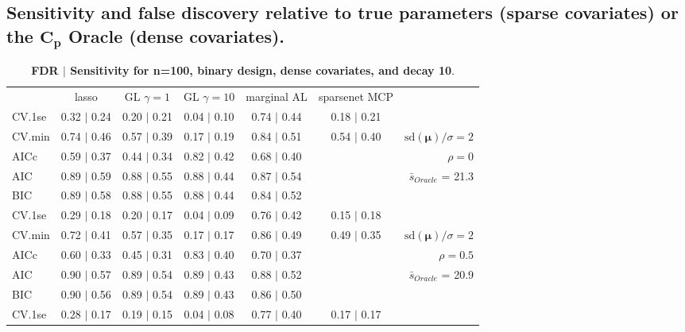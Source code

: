 \clearpage

\subsection{Sensitivity and false discovery relative to true parameters
 (sparse covariates) or the $\boldsymbol{C_p}$ Oracle (dense covariates). }


\begin{table}\vspace{-.5cm}
\caption[l]{ {\it }
{ \bf FDR $\boldsymbol{\mid}$ Sensitivity for n=100, binary design, dense covariates, and  decay  10}.}
\vspace{-.5cm}
\footnotesize{}
\begin{center}
\begin{tabular}{l*{5}{c}|r}
 & lasso & GL $\gamma=1$ & GL $\gamma=10$ & marginal AL & sparsenet MCP  & \\
 \cline{1-7}
CV.1se & 0.32 $\mid$ 0.24 & 0.20 $\mid$ 0.21 & 0.04 $\mid$ 0.10 & 0.74 $\mid$ 0.44 & 0.18 $\mid$ 0.21 & \\
CV.min & 0.74 $\mid$ 0.46 & 0.57 $\mid$ 0.39 & 0.17 $\mid$ 0.19 & 0.84 $\mid$ 0.51 & 0.54 $\mid$ 0.40 &  $\mathrm{sd}(\mathbf{\mu})/\sigma=2$ \\
AICc & 0.59 $\mid$ 0.37 & 0.44 $\mid$ 0.34 & 0.82 $\mid$ 0.42 & 0.68 $\mid$ 0.40 & & $\rho=0$ \\
AIC & 0.89 $\mid$ 0.59 & 0.88 $\mid$ 0.55 & 0.88 $\mid$ 0.44 & 0.87 $\mid$ 0.54 & &  \multirow{2}{*}{$\bar{s}_{Oracle}$ = 21.3} \\
BIC & 0.89 $\mid$ 0.58 & 0.88 $\mid$ 0.55 & 0.88 $\mid$ 0.44 & 0.84 $\mid$ 0.52 & &  \\
 \hline 
CV.1se & 0.29 $\mid$ 0.18 & 0.20 $\mid$ 0.17 & 0.04 $\mid$ 0.09 & 0.76 $\mid$ 0.42 & 0.15 $\mid$ 0.18 & \\
CV.min & 0.72 $\mid$ 0.41 & 0.57 $\mid$ 0.35 & 0.17 $\mid$ 0.17 & 0.86 $\mid$ 0.49 & 0.49 $\mid$ 0.35 &  $\mathrm{sd}(\mathbf{\mu})/\sigma=2$ \\
AICc & 0.60 $\mid$ 0.33 & 0.45 $\mid$ 0.31 & 0.83 $\mid$ 0.40 & 0.70 $\mid$ 0.37 & & $\rho=0.5$ \\
AIC & 0.90 $\mid$ 0.57 & 0.89 $\mid$ 0.54 & 0.89 $\mid$ 0.43 & 0.88 $\mid$ 0.52 & &  \multirow{2}{*}{$\bar{s}_{Oracle}$ = 20.9} \\
BIC & 0.90 $\mid$ 0.56 & 0.89 $\mid$ 0.54 & 0.89 $\mid$ 0.43 & 0.86 $\mid$ 0.50 & &  \\
 \hline 
CV.1se & 0.28 $\mid$ 0.17 & 0.19 $\mid$ 0.15 & 0.04 $\mid$ 0.08 & 0.77 $\mid$ 0.40 & 0.17 $\mid$ 0.17 & \\

\end{tabular}
\end{center}
\end{table}
